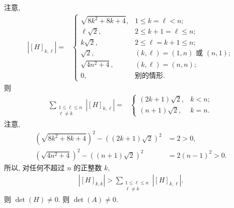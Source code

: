 \documentclass[../libro.tex]{subfiles}
\begin{document}
\begin{example}
    注意,
    \begin{align*}
        |[H]_{k,\ell}|
        = {} &
        \begin{cases}
            \sqrt{8k^2 + 8k + 4}, & 1 \leq k = \ell < n;                        \\
            \ell \sqrt{2},        & 2 \leq k + 1 = \ell \leq n;                 \\
            k \sqrt{2},           & 2 \leq \ell = k + 1 \leq n;                 \\
            \sqrt{2},             & \text{\((k, \ell) = (1, n)\) 或 \((n, 1)\)}; \\
            \sqrt{4n^2 + 4},      & (k, \ell) = (n, n);                         \\
            0,                    & \text{别的情形}.
        \end{cases}
    \end{align*}
    则
    \begin{align*}
        \sum_{\substack{1 \leq \ell \leq n \\
        \ell \neq k}} {|[H]_{k,\ell}|}
        = {} &
        \begin{cases}
            (2k + 1) \sqrt{2}, & k < n; \\
            (n + 1) \sqrt{2},  & k = n.
        \end{cases}
    \end{align*}
    注意,
    \begin{align*}
        (\sqrt{8k^2 + 8k + 4})^2 - ((2k + 1) \sqrt{2})^2 & = 2 > 0,         \\
        (\sqrt{4n^2 + 4})^2 - ((n + 1) \sqrt{2})^2       & = 2 (n-1)^2 > 0.
    \end{align*}
    所以, 对任何不超过 \(n\) 的正整数 \(k\),
    \begin{align*}
        |[H]_{k,k}| >
        \sum_{\substack{1 \leq \ell \leq n \\
        \ell \neq k}} {|[H]_{k,\ell}|}.
    \end{align*}
    则 \(\det {(H)} \neq 0\).
    则 \(\det {(A)} \neq 0\).


\end{example}
\end{document}
